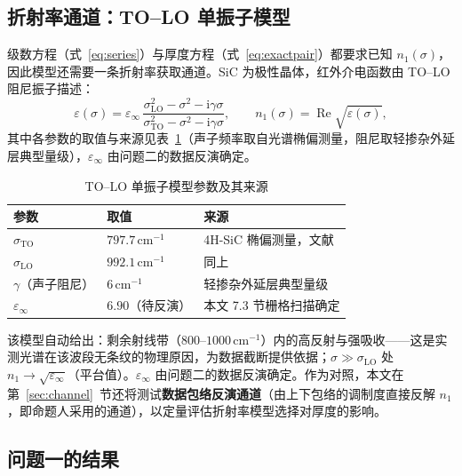 \documentclass[11pt,a4paper,fontset=fandol]{ctexart}
\newcommand{\invcm}{\,\mathrm{cm^{-1}}}
\begin{document}
\subsection{折射率通道：TO--LO 单振子模型}

级数方程（式~\eqref{eq:series}）与厚度方程（式~\eqref{eq:exactpair}）都要求已知 $n_1(\sigma)$，因此模型还需要一条折射率获取通道。SiC 为极性晶体，红外介电函数由 TO--LO 阻尼振子描述\cite{spitzer1959,madan2024}：
\begin{equation}
    \varepsilon(\sigma) = \varepsilon_\infty\,
    \frac{\sigma_{\mathrm{LO}}^2-\sigma^2-\mathrm{i}\gamma\sigma}
         {\sigma_{\mathrm{TO}}^2-\sigma^2-\mathrm{i}\gamma\sigma},
    \qquad n_1(\sigma)=\operatorname{Re}\sqrt{\varepsilon(\sigma)},
    \label{eq:oscillator}
\end{equation}
其中各参数的取值与来源见表~\ref{tab:oscparam}（声子频率取自光谱椭偏测量\cite{madan2024}，阻尼取轻掺杂外延层典型量级\cite{macmillan1998}），$\varepsilon_\infty$ 由问题二的数据反演确定。

\begin{table}[!htb]
    \centering
    \caption{TO--LO 单振子模型参数及其来源}
    \label{tab:oscparam}
    \small
    \begin{tabular}{lll}
        \toprule
        参数 & 取值 & 来源 \\
        \midrule
        $\sigma_{\mathrm{TO}}$ & $797.7\invcm$ & 4H-SiC 椭偏测量，文献\cite{madan2024} \\
        $\sigma_{\mathrm{LO}}$ & $992.1\invcm$ & 同上 \\
        $\gamma$（声子阻尼） & $6\invcm$ & 轻掺杂外延层典型量级\cite{macmillan1998} \\
        $\varepsilon_\infty$ & $6.90$（待反演） & 本文 7.3 节栅格扫描确定 \\
        \bottomrule
    \end{tabular}
\end{table}该模型自动给出：剩余射线带（$800\text{--}1000\invcm$）内的高反射与强吸收——这是实测光谱在该波段无条纹的物理原因，为数据截断提供依据；$\sigma\gg\sigma_{\mathrm{LO}}$ 处 $n_1\to\sqrt{\varepsilon_\infty}$（平台值）。$\varepsilon_\infty$ 由问题二的数据反演确定。作为对照，本文在第~\ref{sec:channel}~节还将测试\textbf{数据包络反演通道}（由上下包络的调制度直接反解 $n_1$，即命题人采用的通道\cite{xue2026}），以定量评估折射率模型选择对厚度的影响。

\subsection{问题一的结果}\label{sec:modelsummary}
\end{document}
